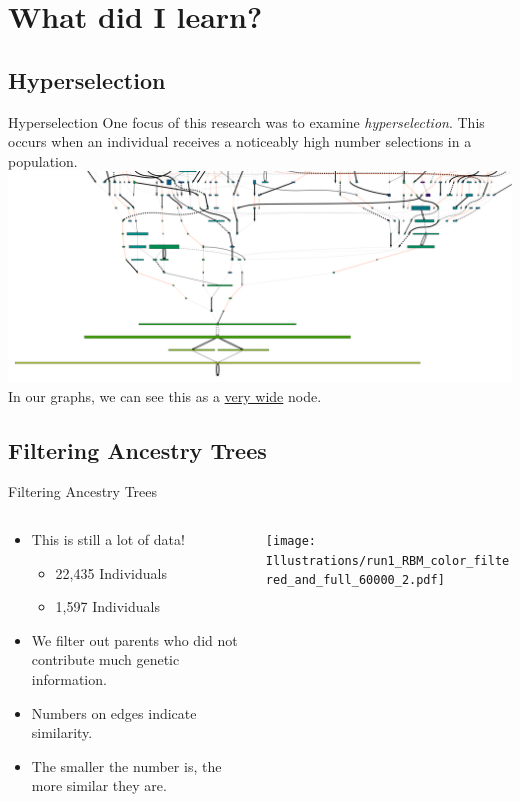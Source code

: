 \documentclass{beamer}
\begin{document}

\section{What did I learn?}

\subsection{Hyperselection}
\begin{frame}{Hyperselection}
One focus of this research was to examine \textit{hyperselection}.
This occurs when an individual receives a noticeably high number selections in a population. 
\center \includegraphics[width=\textwidth]{Illustrations/cropped.pdf} \\
In our graphs, we can see this as a \underline{very wide} node. 
\end{frame}

\subsection{Filtering Ancestry Trees}

\begin{frame}{Filtering Ancestry Trees}
\begin{columns}
\begin{column}{.6\textwidth}
\begin{itemize}
\item This is still a lot of data!
\begin{itemize}
\item 22,435 Individuals
\item 1,597 Individuals
\end{itemize}
\item We filter out parents who did not contribute much genetic information.
\item Numbers on edges indicate similarity.
\item The smaller the number is, the more similar they are.
\end{itemize}
\end{column}
\begin{column}{.45\textwidth}
\center
\texttt{[image: Illustrations/run1\_RBM\_color\_filtered\_and\_full\_60000\_2.pdf]} 
\end{column}
\end{columns}
\end{frame}
\end{document}
